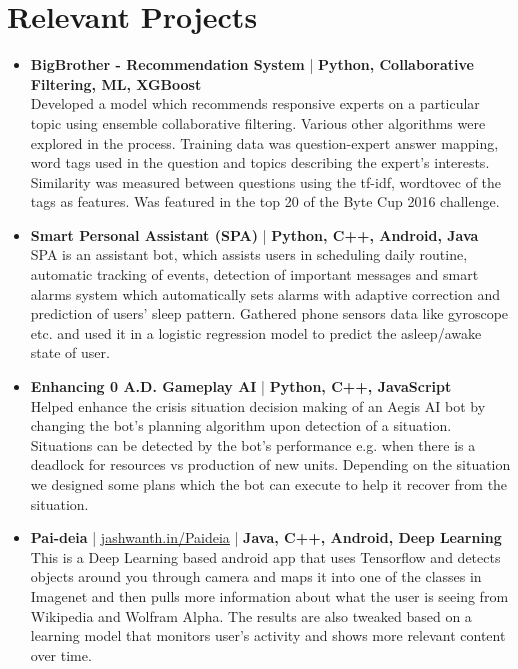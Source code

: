 \section{Relevant Projects}
\begin{itemize}
\item \textbf{BigBrother - Recommendation System} | \textbf{Python, Collaborative Filtering, ML, XGBoost}\\
 Developed a model which recommends responsive experts on a particular topic using ensemble collaborative filtering. Various other algorithms were explored in the process. Training data was question-expert answer mapping, word tags used in the question and topics describing the expert’s interests. Similarity was measured between questions using the tf-idf, wordtovec of the tags as features. Was featured in the top 20 of the Byte Cup 2016  challenge.

\item \textbf{Smart Personal Assistant (SPA)} | \textbf{Python, C++, Android, Java}\\
 SPA is an assistant bot, which assists users in scheduling daily routine, automatic tracking of events, detection of important messages and smart alarms system which automatically sets alarms with adaptive correction and prediction of users’ sleep pattern. Gathered phone sensors data like gyroscope etc. and used it in a logistic regression model to predict the asleep/awake state of user.

\item \textbf{Enhancing 0 A.D. Gameplay AI} | \textbf{Python, C++, JavaScript}\\
 Helped enhance the crisis situation decision making of an Aegis AI bot by changing the bot’s planning algorithm upon detection of a situation. Situations can be detected by the bot’s performance e.g. when there is a deadlock for resources vs production of new units. Depending on the situation we designed some plans which the bot can execute to help it recover from the situation.

 \item \textbf{Pai-deia} | \href{http://alseambusher.github.io/Paideia}{jashwanth.in/Paideia} | \textbf{Java, C++, Android, Deep Learning}\\
 This is a Deep Learning based android app that uses Tensorflow and detects objects around you through camera and maps it into one of the classes in Imagenet and then pulls more information about what the user is seeing from Wikipedia and Wolfram Alpha. The results are also tweaked based on a learning model that monitors user's activity and shows more relevant content over time.


\end{itemize}
\vspace{5pt}
